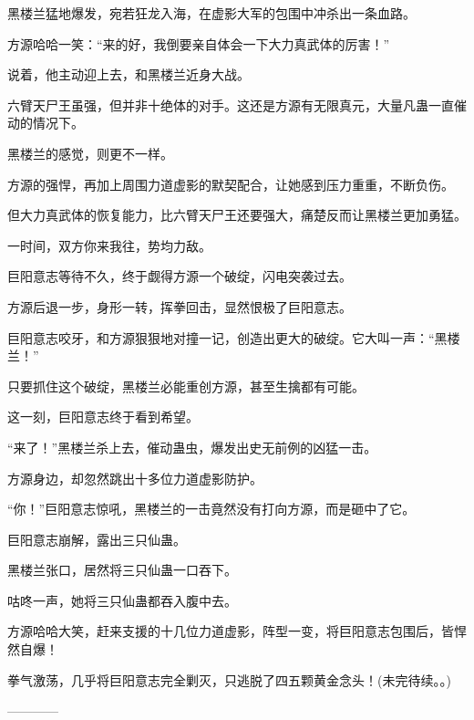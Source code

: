 \begin{this_body}
黑楼兰猛地爆发，宛若狂龙入海，在虚影大军的包围中冲杀出一条血路。

方源哈哈一笑：“来的好，我倒要亲自体会一下大力真武体的厉害！”

说着，他主动迎上去，和黑楼兰近身大战。

六臂天尸王虽强，但并非十绝体的对手。这还是方源有无限真元，大量凡蛊一直催动的情况下。

黑楼兰的感觉，则更不一样。

方源的强悍，再加上周围力道虚影的默契配合，让她感到压力重重，不断负伤。

但大力真武体的恢复能力，比六臂天尸王还要强大，痛楚反而让黑楼兰更加勇猛。

一时间，双方你来我往，势均力敌。

巨阳意志等待不久，终于觑得方源一个破绽，闪电突袭过去。

方源后退一步，身形一转，挥拳回击，显然恨极了巨阳意志。

巨阳意志咬牙，和方源狠狠地对撞一记，创造出更大的破绽。它大叫一声：“黑楼兰！”

只要抓住这个破绽，黑楼兰必能重创方源，甚至生擒都有可能。

这一刻，巨阳意志终于看到希望。

“来了！”黑楼兰杀上去，催动蛊虫，爆发出史无前例的凶猛一击。

方源身边，却忽然跳出十多位力道虚影防护。

“你！”巨阳意志惊吼，黑楼兰的一击竟然没有打向方源，而是砸中了它。

巨阳意志崩解，露出三只仙蛊。

黑楼兰张口，居然将三只仙蛊一口吞下。

咕咚一声，她将三只仙蛊都吞入腹中去。

方源哈哈大笑，赶来支援的十几位力道虚影，阵型一变，将巨阳意志包围后，皆悍然自爆！

拳气激荡，几乎将巨阳意志完全剿灭，只逃脱了四五颗黄金念头！(未完待续。。)

------------

\end{this_body}

